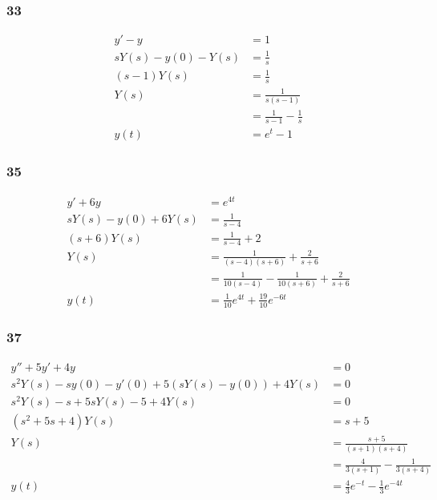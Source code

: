 \documentclass{article}
\begin{document}
\subsubsection{33}

\begin{align*}
  y' - y               & = 1                             \\
  s Y(s) - y(0) - Y(s) & = \frac{1}{s}                   \\
  (s - 1) Y(s)         & = \frac{1}{s}                   \\
  Y(s)                 & = \frac{1}{s (s - 1)}           \\
                       & = \frac{1}{s - 1} - \frac{1}{s} \\
  y(t)                 & = e^t - 1
\end{align*}

\subsubsection{35}

\begin{align*}
  y' + 6 y               & = e^{4 t}                                                       \\
  s Y(s) - y(0) + 6 Y(s) & = \frac{1}{s - 4}                                               \\
  (s + 6) Y(s)           & = \frac{1}{s - 4} + 2                                           \\
  Y(s)                   & = \frac{1}{(s - 4) (s + 6)} + \frac{2}{s + 6}                   \\
                         & = \frac{1}{10 (s - 4)} - \frac{1}{10 (s + 6)} + \frac{2}{s + 6} \\
  y(t)                   & = \frac{1}{10} e^{4 t} + \frac{19}{10} e^{-6 t}
\end{align*}

\subsubsection{37}

\begin{align*}
  y'' + 5 y' + 4 y                                       & = 0                                         \\
  s^2 Y(s) - s y(0) - y'(0) + 5 (s Y(s) - y(0)) + 4 Y(s) & = 0                                         \\
  s^2 Y(s) - s + 5 s Y(s) - 5 + 4 Y(s)                   & = 0                                         \\
  (s^2 + 5 s + 4) Y(s)                                   & = s + 5                                     \\
  Y(s)                                                   & = \frac{s + 5}{(s + 1) (s + 4)}             \\
                                                         & = \frac{4}{3 (s + 1)} - \frac{1}{3 (s + 4)} \\
  y(t)                                                   & = \frac{4}{3} e^{-t} - \frac{1}{3} e^{-4 t}
\end{align*}
\end{document}
